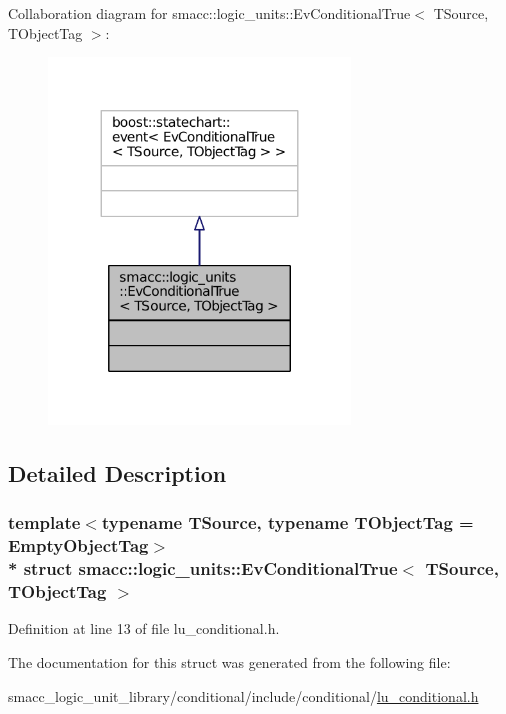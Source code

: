 Collaboration diagram for smacc\+:\+:logic\+\_\+units\+:\+:Ev\+Conditional\+True$<$ T\+Source, T\+Object\+Tag $>$\+:
\nopagebreak
\begin{figure}[H]
\begin{center}
\leavevmode
\includegraphics[width=227pt]{structsmacc_1_1logic__units_1_1EvConditionalTrue__coll__graph}
\end{center}
\end{figure}


\subsection{Detailed Description}
\subsubsection*{template$<$typename T\+Source, typename T\+Object\+Tag = Empty\+Object\+Tag$>$\\*
struct smacc\+::logic\+\_\+units\+::\+Ev\+Conditional\+True$<$ T\+Source, T\+Object\+Tag $>$}



Definition at line 13 of file lu\+\_\+conditional.\+h.



The documentation for this struct was generated from the following file\+:\begin{DoxyCompactItemize}
\item 
smacc\+\_\+logic\+\_\+unit\+\_\+library/conditional/include/conditional/\hyperlink{lu__conditional_8h}{lu\+\_\+conditional.\+h}\end{DoxyCompactItemize}
